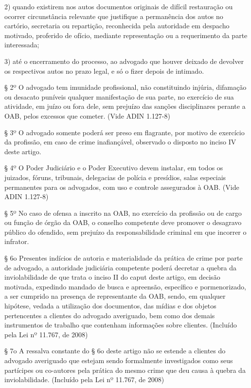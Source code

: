 \documentclass[12pt]{article}
\begin{document}
2) quando existirem nos autos documentos originais de difícil restauração ou ocorrer circunstância relevante que justifique a permanência dos autos no cartório, secretaria ou repartição, reconhecida pela autoridade em despacho motivado, proferido de ofício, mediante representação ou a requerimento da parte interessada;

3) até o encerramento do processo, ao advogado que houver deixado de devolver os respectivos autos no prazo legal, e só o fizer depois de intimado.

§ 2º O advogado tem imunidade profissional, não constituindo injúria, difamação ou desacato puníveis qualquer manifestação de sua parte, no exercício de sua atividade, em juízo ou fora dele, sem prejuízo das sanções disciplinares perante a OAB, pelos excessos que cometer.        (Vide ADIN 1.127-8)

§ 3º O advogado somente poderá ser preso em flagrante, por motivo de exercício da profissão, em caso de crime inafiançável, observado o disposto no inciso IV deste artigo.

§ 4º O Poder Judiciário e o Poder Executivo devem instalar, em todos os juizados, fóruns, tribunais, delegacias de polícia e presídios, salas especiais permanentes para os advogados, com uso e controle assegurados à OAB.     (Vide ADIN 1.127-8)

§ 5º No caso de ofensa a inscrito na OAB, no exercício da profissão ou de cargo ou função de órgão da OAB, o conselho competente deve promover o desagravo público do ofendido, sem prejuízo da responsabilidade criminal em que incorrer o infrator.

§ 6o  Presentes indícios de autoria e materialidade da prática de crime por parte de advogado, a autoridade judiciária competente poderá decretar a quebra da inviolabilidade de que trata o inciso II do caput deste artigo, em decisão motivada, expedindo mandado de busca e apreensão, específico e pormenorizado, a ser cumprido na presença de representante da OAB, sendo, em qualquer hipótese, vedada a utilização dos documentos, das mídias e dos objetos pertencentes a clientes do advogado averiguado, bem como dos demais instrumentos de trabalho que contenham informações sobre clientes.       (Incluído pela Lei nº 11.767, de 2008)

§ 7o  A ressalva constante do § 6o deste artigo não se estende a clientes do advogado averiguado que estejam sendo formalmente investigados como seus partícipes ou co-autores pela prática do mesmo crime que deu causa à quebra da inviolabilidade.       (Incluído pela Lei nº 11.767, de 2008)
\end{document}
